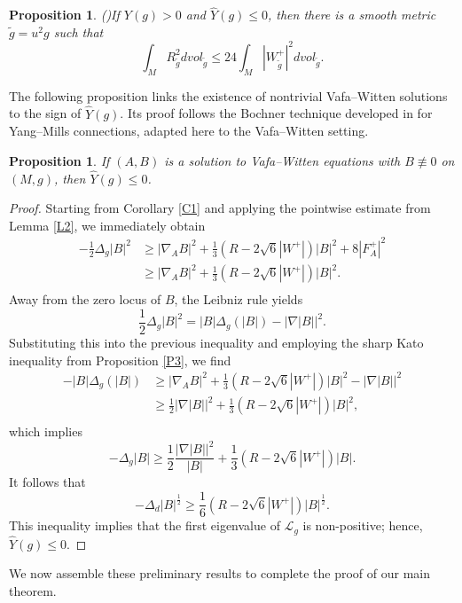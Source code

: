 \documentclass[12pt, twoside]{article}
\newtheorem{proposition}[theorem]{Proposition}
\theoremstyle{definition}
\numberwithin{equation}{section}
\def \De {\Delta}
\def\na {\nabla}
\begin{document}
\begin{proposition}(\cite[Proposition 3.5]{Gur00})\label{P2}
If $Y(g)>0$ and $\hat{Y}(g)\leq 0$, then there is a smooth metric $\tilde{g}=u^{2}g$ such that
\[\int_{M}R^{2}_{\tilde{g}}dvol_{\tilde{g}}\leq 24\int_{M}|W^{+}_{\tilde{g}}|^{2}dvol_{\tilde{g}}. \]
\end{proposition}

The following proposition links the existence of nontrivial Vafa--Witten solutions to the sign of $\hat{Y}(g)$. 
Its proof follows the Bochner technique developed in \cite{GKS18} for Yang--Mills connections, adapted here to the Vafa--Witten setting.

\begin{proposition}\label{P4}
If $(A,B)$ is a solution to Vafa--Witten equations with $B\not\equiv 0$ on $(M,g)$, then $\hat{Y}(g)\leq 0$.
\end{proposition}

\begin{proof}
Starting from Corollary \ref{C1} and applying the pointwise estimate from Lemma \ref{L2}, we immediately obtain
\begin{equation*}
\begin{split}
-\frac{1}{2}\De_{g}|B|^{2}&\geq|\na_{A}B|^{2}+\frac{1}{3}(R-2\sqrt{6}|W^{+}|)|B|^{2}+8|F^{+}_{A}|^{2}\\
&\geq|\na_{A}B|^{2}+\frac{1}{3}(R-2\sqrt{6}|W^{+}|)|B|^{2}.\\
\end{split}
\end{equation*}
Away from the zero locus of $B$, the Leibniz rule yields
\[\frac{1}{2}\De_{g}|B|^{2}=|B|\De_{g}(|B|)-|\na|B||^{2}.\]
Substituting this into the previous inequality and employing the sharp Kato inequality from Proposition \ref{P3}, we find
\begin{equation*}
\begin{split}
-|B|\De_{g}(|B|)&\geq|\na_{A}B|^{2}+\frac{1}{3}(R-2\sqrt{6}|W^{+}|)|B|^{2}-|\na|B||^{2}\\
&\geq \frac{1}{2}|\na|B||^{2}+\frac{1}{3}(R-2\sqrt{6}|W^{+}|)|B|^{2},\\
\end{split}
\end{equation*}
which implies
\[-\De_{g}|B|\geq\frac{1}{2}\frac{|\na|B||^{2} }{|B|}+\frac{1}{3} (R-2\sqrt{6}|W^{+}|)|B|.\]
It follows that 
\[-\De_{d}|B|^{\frac{1}{2}}\geq\frac{1}{6} (R-2\sqrt{6}|W^{+}|)|B|^{\frac{1}{2}}.\]
This inequality implies that the first eigenvalue of $\mathcal{L}_{g}$ is non-positive; hence, $\hat{Y}(g)\leq0$.
\end{proof}
We now assemble these preliminary results to complete the proof of our main theorem.
\end{document}
